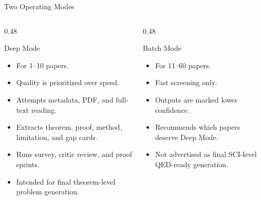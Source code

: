 \documentclass[aspectratio=169,11pt]{beamer}
\newcommand{\DeepMode}{Deep Mode}
\newcommand{\BatchMode}{Batch Mode}
\begin{document}
\begin{frame}{Two Operating Modes}
  \begin{columns}[T]
    \begin{column}{0.48\textwidth}
      \begin{block}{\DeepMode}
        \begin{itemize}
          \item For 1--10 papers.
          \item Quality is prioritized over speed.
          \item Attempts metadata, PDF, and full-text reading.
          \item Extracts theorem, proof, method, limitation, and gap cards.
          \item Runs survey, critic review, and proof sprints.
          \item Intended for final theorem-level problem generation.
        \end{itemize}
      \end{block}
    \end{column}
    \begin{column}{0.48\textwidth}
      \begin{block}{\BatchMode}
        \begin{itemize}
          \item For 11--60 papers.
          \item Fast screening only.
          \item Outputs are marked lower confidence.
          \item Recommends which papers deserve Deep Mode.
          \item Not advertised as final SCI-level QED-ready generation.
        \end{itemize}
      \end{block}
    \end{column}
  \end{columns}
\end{frame}
\end{document}
